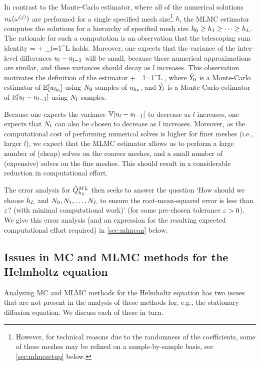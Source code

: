 In contrast to the Monte-Carlo estimator, where all of the numerical solutions $u_{h}(\omega^{(j)})$ are performed for a single specified mesh size\footnote{However, for technical reasons due to the randomness of the coefficients, some of these meshes may be refined on a sample-by-sample basis, see \cref{sec:mlmcsetup} below.} $h$, the MLMC estimator computes the solutions for a hierarchy of specified mesh size $h_{0} \geq h_{1} \geq \cdots \geq h_{L}.$ The rationale for such a computation is an observation that the telescoping sum identity
\beq\label{eq:mlmctelescope}
\EXP{\uhL} = \EXP{\uhz} + \sum_{l=1}^L \EXP{\uhl-\uhlmo}
\eeq
holds. Moreover, one expects that the variance of the inter-level differences $u_{l}-u_{l-1}$ will be small, because these numerical approximations are similar, and these variances should decay as $l$ increases. This observation motivates the definition of the  estimator
\beqs
\QhatMLhL \de \Yzhat + \sum_{l=1}^L \Ylhat,
\eeqs
where $\hat{Y}_{0}$ is a Monte-Carlo estimator of $\EXP{\uhz}$ using $N_{0}$ samples of $u_{h_{0}}$, and $\hat{Y_{l}}$ is a Monte-Carlo estimator of $\EXP{\uhl-\uhlmo}$ using $N_{l}$ samples.

Because one expects the variance $\VAR{\uhl-\uhlmo}$ to decrease as $l$ increases, one expects that $N_{l}$ can also be chosen to decrease as $l$ increases. Moreover, as the computational cost of performing numerical solves is higher for finer meshes (i.e., larger $l$), we expect that the MLMC estimator allows us to perform a large number of (cheap) solves on the coarser meshes, and a small number of (expensive) solves on the fine meshes. This should result in a considerable reduction in computational effort.

The error analysis for $\hat{Q}^{ML}_{h_{L}}$ then seeks to answer the question `How should we choose $h_{L}$ and $N_{0},N_{1},\ldots,N_{L}$ to ensure the root-mean-squared error is less than $\varepsilon$? (with minimal computational work)' (for some pre-chosen tolerance $\varepsilon > 0$). We give this error analysis (and an expression for the resulting expected computational effort required) in \cref{sec:mlmcan} below.

\subsection{Issues in MC and MLMC methods for the Helmholtz equation}

Analysing MC and MLMC methods for the Helmholtz equation has two issues that are not present in the analysis of these methods for, e.g., the stationary diffusion equation. We discuss each of these in turn.

